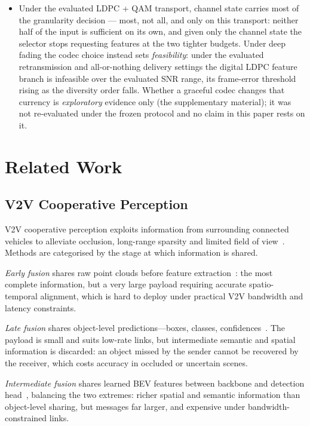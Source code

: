 \documentclass[journal]{IEEEtran}
\begin{document}
\begin{itemize}
    \item Under the evaluated LDPC + QAM transport, channel state carries most of the granularity decision --- most, not all, and only on this transport: neither half of the input is sufficient on its own, and given only the channel state the selector stops requesting features at the two tighter budgets. Under deep fading the codec choice instead sets \emph{feasibility}: under the evaluated retransmission and all-or-nothing delivery settings the digital LDPC feature branch is infeasible over the evaluated SNR range, its frame-error threshold rising as the diversity order falls. Whether a graceful codec changes that currency is \emph{exploratory} evidence only (the supplementary material); it was not re-evaluated under the frozen protocol and no claim in this paper rests on it.
\end{itemize}

\section{Related Work}

\subsection{V2V Cooperative Perception}

V2V cooperative perception exploits information from surrounding connected vehicles to alleviate occlusion, long-range sparsity and limited field of view~\cite{xu2022opv2v}. Methods are categorised by the stage at which information is shared.

\emph{Early fusion} shares raw point clouds before feature extraction~\cite{xu2022opv2v}: the most complete information, but a very large payload requiring accurate spatio-temporal alignment, which is hard to deploy under practical V2V bandwidth and latency constraints.

\emph{Late fusion} shares object-level predictions---boxes, classes, confidences~\cite{xu2022opv2v}. The payload is small and suits low-rate links, but intermediate semantic and spatial information is discarded: an object missed by the sender cannot be recovered by the receiver, which costs accuracy in occluded or uncertain scenes.

\emph{Intermediate fusion} shares learned BEV features between backbone and detection head~\cite{xu2022v2xvit,hu2022where2comm}, balancing the two extremes: richer spatial and semantic information than object-level sharing, but messages far larger, and expensive under bandwidth-constrained links.
\end{document}
